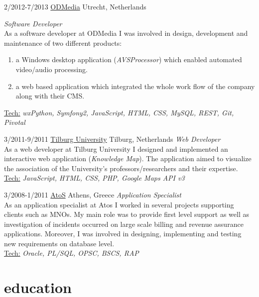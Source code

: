 \documentclass[]{friggeri-cv} %
\begin{document}
\begin{entrylist}
\entry
{2/2012-7/2013}
{\href{http://odmedia.nl}{ODMedia}}
{Utrecht, Netherlands}
{\emph {Software Developer} \\
As a software developer at ODMedia I was involved in design, development and maintenance of two different products:
\begin{enumerate}
\item a Windows desktop application (\emph{AVSProcessor}) which enabled automated video/audio processing.
\item a web based application which integrated the whole work flow of the company along with their CMS.
\end{enumerate}
\ul{Tech:} \emph{wxPython, Symfony2, JavaScript, HTML, CSS, MySQL, REST, Git, Pivotal}
}

\entry
{3/2011-9/2011}
{\href{https://www.tilburguniversity.edu}{Tilburg University}}
{Tilburg, Netherlands}
{\emph {Web Developer} \\
As a web developer at Tilburg University I designed and implemented an interactive web application (\emph{Knowledge Map}). The application aimed to visualize the association of the University's professors/researchers and their expertise.\\
\ul{Tech:} \emph{JavaScript, HTML, CSS, PHP, Google Maps API v3}
}


\entry
{3/2008-1/2011}
{\href{http://atos.net/en-us/home.html}{AtoS}}
{Athens, Greece}
{\emph {Application Specialist}\\
As an application specialist at Atos I worked in several projects supporting clients such as MNOs. My main role was to provide first level support as well as investigation of incidents occurred on large scale billing and revenue assurance applications. Moreover, I was involved in designing, implementing and testing new requirements on database level.\\
\ul{Tech:} \emph{Oracle, PL/SQL, OPSC, BSCS, RAP} \\
}

\end{entrylist}



\section{education}
\end{document}
